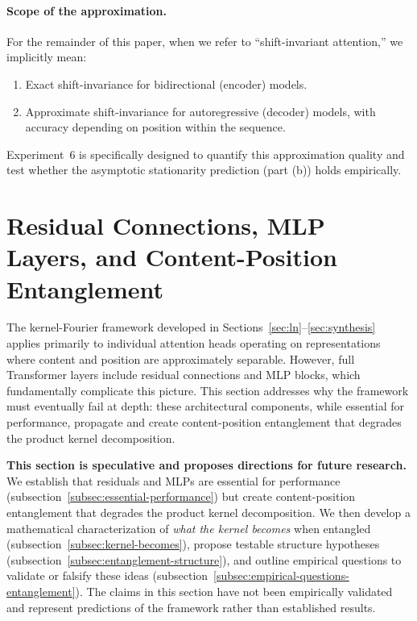 \documentclass[11pt]{article}
\theoremstyle{definition}
\begin{document}
\paragraph{Scope of the approximation.}
For the remainder of this paper, when we refer to ``shift-invariant attention,'' we implicitly mean:
\begin{enumerate}
    \item Exact shift-invariance for bidirectional (encoder) models.
    \item Approximate shift-invariance for autoregressive (decoder) models, with accuracy depending on position within the sequence.
\end{enumerate}
Experiment~6 is specifically designed to quantify this approximation quality and test whether the asymptotic stationarity prediction (part (b)) holds empirically.

\section{Residual Connections, MLP Layers, and Content-Position Entanglement}
\label{sec:residual-mlp}

The kernel-Fourier framework developed in Sections~\ref{sec:ln}--\ref{sec:synthesis} applies primarily to individual attention heads operating on representations where content and position are approximately separable. However, full Transformer layers include residual connections and MLP blocks, which fundamentally complicate this picture. This section addresses why the framework must eventually fail at depth: these architectural components, while essential for performance, propagate and create content-position entanglement that degrades the product kernel decomposition.

\textbf{This section is speculative and proposes directions for future research.} We establish that residuals and MLPs are essential for performance (subsection~\ref{subsec:essential-performance}) but create content-position entanglement that degrades the product kernel decomposition. We then develop a mathematical characterization of \emph{what the kernel becomes} when entangled (subsection~\ref{subsec:kernel-becomes}), propose testable structure hypotheses (subsection~\ref{subsec:entanglement-structure}), and outline empirical questions to validate or falsify these ideas (subsection~\ref{subsec:empirical-questions-entanglement}). The claims in this section have not been empirically validated and represent predictions of the framework rather than established results.
\end{document}
